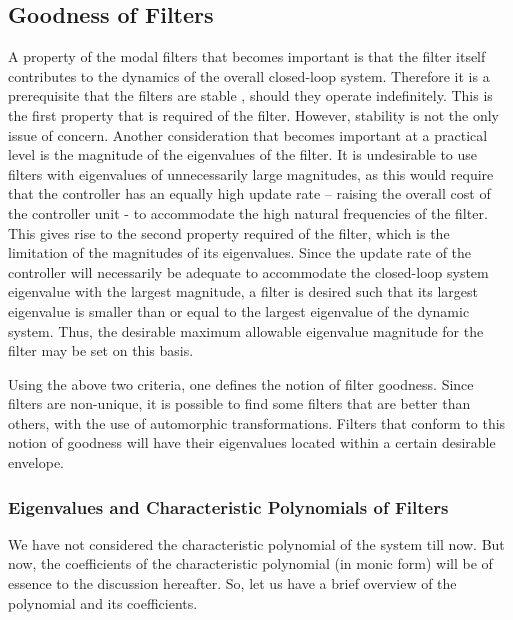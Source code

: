 \subsection{Goodness of Filters}
A property of the modal filters that becomes important  is that the
filter itself contributes to the dynamics of the overall closed-loop 
system. Therefore it is a prerequisite that the filters are stable 
\citep{Garvey2008}, should they operate indefinitely. This is the first 
property that is required of the filter. However, stability is not the 
only issue of concern. Another consideration that becomes important at a 
practical level is the magnitude of the eigenvalues of the filter. It is 
undesirable to use filters with eigenvalues of unnecessarily large
magnitudes, as this would require that the controller has an equally high
update rate – raising the overall cost of the controller unit - to 
accommodate the high natural frequencies of the filter. This gives rise to 
the second property required of the filter, which is the limitation of the 
magnitudes of its eigenvalues. Since the update rate of the controller 
will necessarily be adequate to accommodate the closed-loop system 
eigenvalue with the largest magnitude, a filter is desired such that its 
largest eigenvalue is smaller than or equal to the largest eigenvalue of 
the dynamic system. Thus, the desirable maximum allowable eigenvalue 
magnitude for the filter may be set on this basis.

Using the above two criteria, one defines the notion of filter goodness. 
Since filters are non-unique, it is possible to find some filters that are 
better than others, with the use of automorphic transformations. Filters 
that conform to this notion of goodness will have their eigenvalues 
located within a certain desirable envelope.

\subsubsection{Eigenvalues and Characteristic Polynomials of Filters}
We have not considered the characteristic polynomial of the system till 
now. But now, the coefficients of the characteristic polynomial (in monic 
form) will be of essence to the discussion hereafter. So, let us have a 
brief overview of the polynomial and its coefficients.

